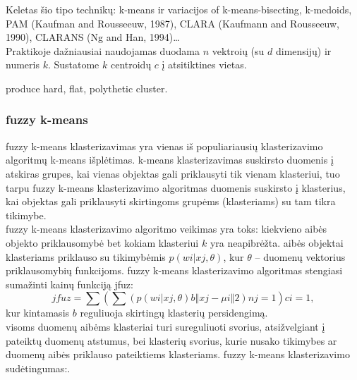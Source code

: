 \documentclass{VUMIFInfKursinis}
\begin{document}
			 Keletas šio tipo technikų: k-means ir variacijos of k-means-bisecting, k-medoids, PAM (Kaufman and Rousseeuw, 1987), CLARA (Kaufmann and Rousseeuw, 1990), CLARANS (Ng and Han, 1994)\ldots \\
			Praktikoje dažniausiai naudojamas duodama $n$ vektroių (su $d$ dimensijų) ir numeris $k$.  Sustatome $k$ centroidų $c$ į atsitiktines vietas.

			 produce hard, flat, polythetic cluster. 


		
		\subsubsection{fuzzy k-means}
			fuzzy k-means klasterizavimas yra vienas iš populiariausių klasterizavimo algoritmų k-means išplėtimas. k-means klasterizavimas suskirsto duomenis į atskiras grupes, kai vienas objektas gali priklausyti tik vienam klasteriui, tuo tarpu fuzzy k-means klasterizavimo algoritmas duomenis suskirsto į klasterius, kai objektas gali priklausyti skirtingoms grupėms (klasteriams) su tam tikra tikimybe.\\
			fuzzy k-means klasterizavimo algoritmo veikimas yra toks: kiekvieno aibės objekto priklausomybė bet kokiam klasteriui $k$ yra neapibrėžta. aibės objektai klasteriams priklauso su tikimybėmis $p(wi | xj, \theta)$, kur $\theta$ – duomenų vektorius priklausomybių funkcijoms. fuzzy k-means klasterizavimo algoritmas stengiasi sumažinti kainų funkciją jfuz:
			\begin{equation}
				jfuz=\sum{(\sum{(p(wi|xj,\theta)b‖xj−μi‖2)}nj=1)}ci = 1,
			\end{equation}
			kur kintamasis $b$ reguliuoja skirtingų klasterių persidengimą.\\
			visoms duomenų aibėms klasteriai turi sureguliuoti svorius, atsižvelgiant į pateiktų duomenų atstumus, bei klasterių svorius, kurie nusako tikimybes ar duomenų aibės priklauso pateiktiems klasteriams. fuzzy k-means klasterizavimo sudėtingumas:.

\end{document}
